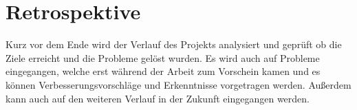 \chapter{Retrospektive}
Kurz vor dem Ende wird der Verlauf des Projekts analysiert und geprüft ob die Ziele erreicht und die Probleme gelöst wurden. Es wird auch auf Probleme eingegangen, welche erst während der Arbeit zum Vorschein kamen und es können Verbesserungsvorschläge und Erkenntnisse vorgetragen werden.
Außerdem kann auch auf den weiteren Verlauf in der Zukunft eingegangen werden.